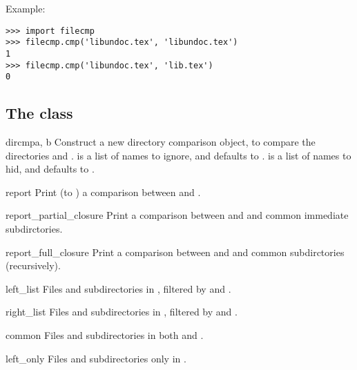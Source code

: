 Example:

\begin{verbatim}
>>> import filecmp
>>> filecmp.cmp('libundoc.tex', 'libundoc.tex')
1
>>> filecmp.cmp('libundoc.tex', 'lib.tex')
0
\end{verbatim}


\subsection{The \protect{} class \label{dircmp-objects}}

\begin{classdesc}{dircmp}{a, b}
Construct a new directory comparison object, to compare the
directories  and .  is a list of names to
ignore, and defaults to .  is a
list of names to hid, and defaults to .
\end{classdesc}

\begin{methoddesc}[dircmp]{report}{}
Print (to ) a comparison between  and .
\end{methoddesc}

\begin{methoddesc}[dircmp]{report_partial_closure}{}
Print a comparison between  and  and common immediate
subdirctories.
\end{methoddesc}

\begin{methoddesc}[dircmp]{report_full_closure}{}
Print a comparison between  and  and common 
subdirctories (recursively).
\end{methoddesc}

\begin{memberdesc}[dircmp]{left_list}
Files and subdirectories in , filtered by  and
.
\end{memberdesc}

\begin{memberdesc}[dircmp]{right_list}
Files and subdirectories in , filtered by  and
.
\end{memberdesc}

\begin{memberdesc}[dircmp]{common}
Files and subdirectories in both  and .
\end{memberdesc}

\begin{memberdesc}[dircmp]{left_only}
Files and subdirectories only in .
\end{memberdesc}

